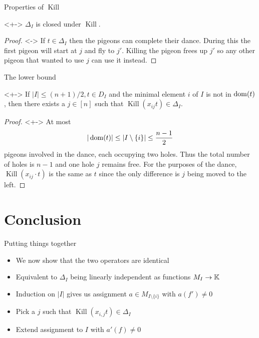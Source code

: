 \documentclass[xcolor={dvipsnames}]{beamer}
\renewcommand{\K}{\operatorname{Kill}}
\begin{document}
\begin{frame}{Properties of $\K$}
     \begin{theorem}<+->
        $\Delta_I$ is closed under $\K$.
     \end{theorem}
    \begin{proof}[Proof\nopunct]<->
        If $t \in \Delta_I$ then the pigeons can complete their dance. During this the first pigeon will start at $j$ and fly to $j'$. Killing the pigeon frees up $j'$ so any other pigeon that wanted to use $j$ can use it instead.
    \end{proof}
\end{frame}

\begin{frame}{The lower bound}
    \begin{theorem}<+->
        If $|I| \leq (n+1) / 2, t \in D_I$ and the minimal element $i$ of $I$ is not in $\operatorname{dom}(t)$, then there exists a $j \in [n]$ such that $\K(x_{ij} t) \in \Delta_I$.
    \end{theorem}
    \begin{proof}[Proof\nopunct]<+->
        At most $$
            |\operatorname{dom}(t)| \leq |I \setminus \{i\}| \leq \frac{n - 1}{2}
        $$ pigeons involved in the dance, each occupying two holes. Thus the total number of holes is $n - 1$ and one hole $j$ remains free. For the purposes of the dance, $\K(x_{ij} \cdot t)$ is the same as $t$ since the only difference is $j$ being moved to the left.
    \end{proof}
\end{frame}

\section{Conclusion}

\begin{frame}{Putting things together}
    \begin{itemize}[<+->]
        \item We now show that the two operators are identical
        \item Equivalent to $\Delta_I$ being linearly independent as functions $M_I \to \mathbb{K}$
        \item Induction on $|I|$ gives us assignment $a \in M_{I\setminus \{i\}}$ with $a(f') \neq 0$
        \item Pick a $j$ such that $\K(x_{i, j} t) \in \Delta_I$
        \item Extend assignment to $I$ with $a'(f) \neq 0$
    \end{itemize}
\end{frame}
\end{document}
